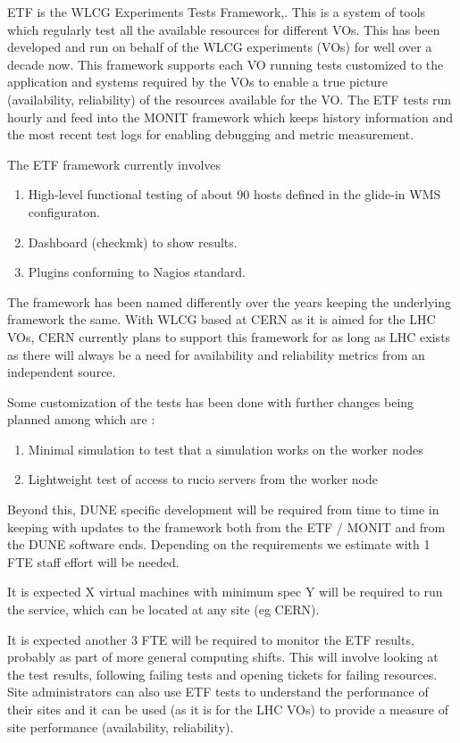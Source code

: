 \documentclass[../main-v1.tex]{subfiles}
\begin{document}
ETF is the WLCG Experiments Tests Framework\cite{bib:ETFDoc},\cite{bib:ETFStatus}. This is a system of tools which regularly test all the available resources for different VOs. This has been developed and run on behalf of the WLCG experiments (VOs) for well over a decade now. This framework supports each VO running tests customized to the application and systems required by the VOs to enable a true picture (availability, reliability) of the resources available for the VO. The ETF tests run hourly and feed into the MONIT framework which keeps history information and the most recent test logs for enabling debugging and metric measurement.

The ETF framework currently involves 
\begin{enumerate}
\item High-level functional testing of about 90 hosts defined in the glide-in WMS configuraton.
\item Dashboard (checkmk) to show results.
\item Plugins conforming to Nagios standard.
\end{enumerate}

The framework has been named differently over the years keeping the underlying framework the same. With WLCG based at CERN as it is aimed for the LHC VOs, CERN currently plans to support this framework for as long as LHC exists as there will always be a need for availability and reliability metrics from an independent source.

Some customization of the tests has been done with further changes being planned among which are :
\begin{enumerate}
    \item Minimal simulation to test that a simulation works on the worker nodes
    \item Lightweight test of access to rucio servers from the worker node
\end{enumerate}

Beyond this, DUNE specific development will be required from time to time in keeping with updates to the framework both from the ETF / MONIT and from the DUNE software ends. Depending on the requirements we estimate  with 1 FTE staff effort will be needed.

It is expected X virtual machines with minimum spec Y will be required to run the service, which can be located at any site (eg CERN).

It is expected another 3 FTE will be required to monitor the ETF results, probably as part of more general computing shifts. This will involve looking at the test results, following failing tests and opening tickets for failing resources. Site administrators can also use ETF tests to understand the performance of their sites and it can be used (as it is for the LHC VOs) to provide a measure of site performance (availability, reliability).
\end{document}
